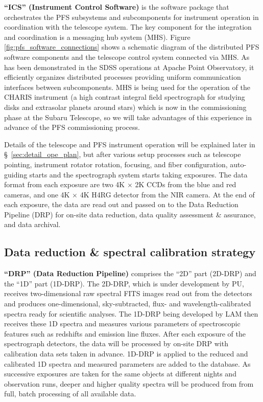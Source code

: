 \documentclass[a4paper]{article}
\begin{document}
{\bf ``ICS'' (Instrument Control Software)} is the software package
that orchestrates the PFS subsystems and subcomponents for instrument
operation in coordination with the telescope system. The key component
for the integration and coordination is a messaging hub system
(MHS). Figure \ref{fig:pfs_software_connections} shows a schematic
diagram of the distributed PFS software components and the telescope
control system connected via MHS. As has been demonstrated in the SDSS
operations at Apache Point Observatory, it efficiently organizes
distributed processes providing uniform communication interfaces
between subcomponents. MHS is being used for the operation of the
CHARIS instrument\cite{charis} (a high contrast integral field
spectrograph for studying disks and extrasolar planets around stars)
which is now in the commissioning phase at the Subaru Telescope, so we
will take advantages of this experience in advance of the PFS
commissioning process.

Details of the telescope and PFS instrument operation will be
explained later in \S~\ref{sec:detail_ope_plan}, but after various setup processes such
as telescope pointing, instrument rotator rotation, focusing, and
fiber configuration, auto-guiding starts and the spectrograph system
starts taking exposures. The data format from each exposure are two 4K
$\times$ 2K CCDs from the blue and red cameras, and one 4K $\times$ 4K
H4RG detector from the NIR camera. At the end of each exposure, the
data are read out and passed on to the Data Reduction Pipeline (DRP)
for on-site data reduction, data quality assessment \& assurance, and
data archival.

\subsection{Data reduction \& spectral calibration strategy\label{sec:operation_concept:reduction_calibration}}

{\bf ``DRP'' (Data Reduction Pipeline)} comprises the ``2D'' part
(2D-DRP) and the ``1D'' part (1D-DRP). The 2D-DRP, which is under
development by PU, receives two-dimensional raw spectral FITS images
read out from the detectors and produces one-dimensional,
sky-subtracted, flux- and wavelength-calibrated spectra ready for
scientific analyses. The 1D-DRP being developed by LAM then receives
these 1D spectra and measures various parameters of spectroscopic
features such as redshifts and emission line fluxes. After each
exposure of the spectrograph detectors, the data will be processed by
on-site DRP with calibration data sets taken in advance.
1D-DRP is applied to the reduced and calibrated 1D spectra and
measured parameters are added to the database. As successive exposures
are taken for the same objects at different nights and observation
runs, deeper and higher quality spectra will be produced from from
full, batch processing of all available data.
\end{document}
